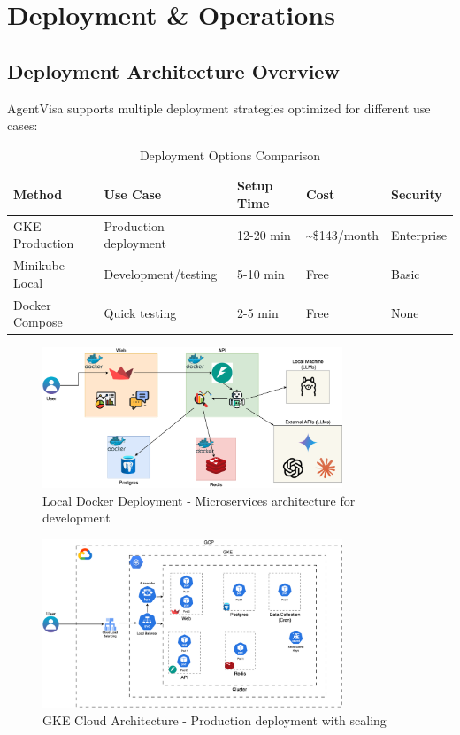 \documentclass[11pt,a4paper]{article}
\begin{document}
\newpage
\section{Deployment \& Operations}

\subsection{Deployment Architecture Overview}
AgentVisa supports multiple deployment strategies optimized for different use cases:

\begin{table}[h!]
\centering
\begin{tabular}{@{}lllll@{}}
\toprule
\textbf{Method} & \textbf{Use Case} & \textbf{Setup Time} & \textbf{Cost} & \textbf{Security} \\
\midrule
GKE Production & Production deployment & 12-20 min & \textasciitilde\$143/month & Enterprise \\
Minikube Local & Development/testing & 5-10 min & Free & Basic \\
Docker Compose & Quick testing & 2-5 min & Free & None \\
\bottomrule
\end{tabular}
\caption{Deployment Options Comparison}
\end{table}

\begin{figure}[h!]
\centering
\includegraphics[width=0.8\textwidth]{local-docker-deployment.png}
\caption{Local Docker Deployment - Microservices architecture for development}
\label{fig:docker}
\end{figure}

\begin{figure}[h!]
\centering
\includegraphics[width=0.8\textwidth]{gke-cloud-architecture.png}
\caption{GKE Cloud Architecture - Production deployment with scaling}
\label{fig:gke}
\end{figure}
\end{document}
